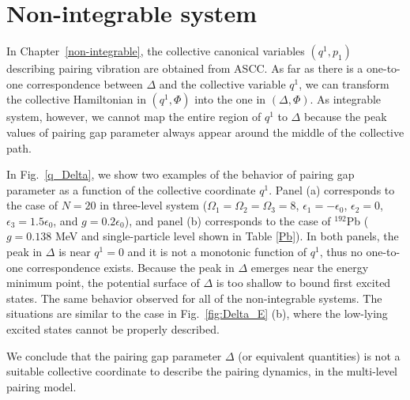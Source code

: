 \documentclass[11pt]{book} %
\begin{document}
\section{Non-integrable system}
In Chapter~\ref{non-integrable}, the collective canonical variables $(q^1, p_1)$ describing pairing vibration are obtained from ASCC.
As far as there is a one-to-one correspondence between $\Delta$ 
and the collective variable $q^1$,
we can transform the collective Hamiltonian in $(q^1,\Phi)$
into the one in $(\Delta,\Phi)$. As integrable system, however, we cannot map the entire region of $q^1$ to $\Delta$ because the peak values of pairing gap parameter always appear around the middle of the collective path.


In Fig.~\ref{q_Delta}, we show two examples of the behavior of pairing gap parameter as a function of the collective coordinate $q^1$.
Panel (a) corresponds to the case of $N=20$ in three-level system ($\Omega_1=\Omega_2=\Omega_3=8$,
$\epsilon_1=-\epsilon_0$, $\epsilon_2=0$, $\epsilon_3=1.5\epsilon_0$,
and $g=0.2\epsilon_0$), and panel (b) corresponds to the case of ${}^{192}$Pb ($g=0.138$ MeV and single-particle level shown in Table \ref{Pb}).
In both panels, the peak in $\Delta$ is near $q^1=0$ and it is not a monotonic
function of $q^1$, thus no one-to-one correspondence exists. 
Because the peak in $\Delta$ emerges near the energy minimum point, the potential surface of $\Delta$ is too shallow to bound first excited states. 
The same behavior observed for all of the non-integrable systems.
The situations are similar to the case in Fig.~\ref{fig:Delta_E} (b), where the low-lying excited states cannot be properly described.

We conclude that the pairing gap parameter $\Delta$ (or equivalent quantities) is not a suitable collective coordinate to describe the pairing dynamics, in the multi-level pairing model. 

\end{document}
